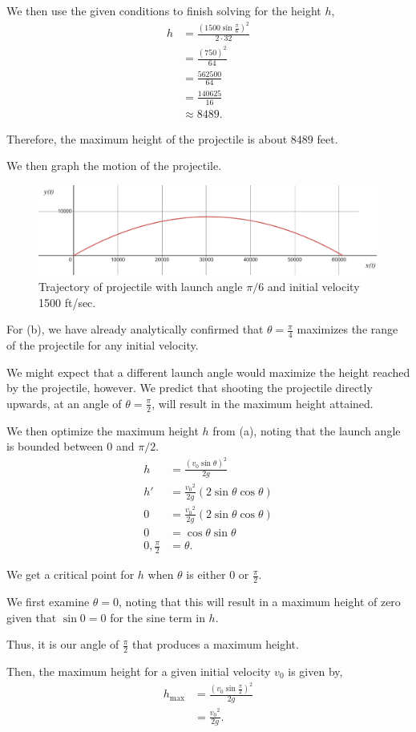 \documentclass[../hw10]{subfiles}
\begin{document}
We then use the given conditions to finish solving for the height $h$,
\begin{align*}
  h&=\frac{{(1500\sin{\frac{\pi}{6}})}^2}{2\cdot32} \\
  &= \frac{{(750)}^2}{64} \\
  &= \frac{562500}{64} \\
  &= \frac{140625}{16} \\
  &\approx 8489.
\end{align*}

Therefore, the maximum height of the projectile is about 8489 feet.

We then graph the motion of the projectile.
\begin{figure}[ht]
\centering
\includegraphics[width=0.8\linewidth]{../content/figure1.png}
\caption{Trajectory of projectile with launch angle $\pi/6$ and initial velocity 1500 ft/sec.}
\end{figure}

For (b), we have already analytically confirmed that $\theta=\frac{\pi}{4}$ maximizes the range of the projectile for any initial velocity. 

We might expect that a different launch angle would maximize the height reached by the projectile, however. We predict that shooting the projectile directly upwards, at an angle of $\theta=\frac{\pi}{2}$, will result in the maximum height attained.

We then optimize the maximum height $h$ from (a), noting that the launch angle is bounded between 0 and $\pi/2$.
\begin{align*}
    h&=\frac{{(v_0\sin{\theta})}^2}{2g} \\ 
    h'&=\frac{{v_0}^2}{2g}(2\sin{\theta}\cos{\theta}) \\
    0&=\frac{{v_0}^2}{2g}(2\sin{\theta}\cos{\theta}) \\
    0&=\cos{\theta}\sin{\theta} \\
    0,\frac{\pi}{2}&=\theta.
\end{align*}

We get a critical point for $h$ when $\theta$ is either $0$ or $\frac{\pi}{2}$. 

We first examine $\theta=0$, noting that this will result in a maximum height of zero given that $\sin{0}=0$ for the sine term in $h$. 

Thus, it is our angle of $\frac{\pi}{2}$ that produces a maximum height.

Then, the maximum height for a given initial velocity $v_0$ is given by,
\begin{align*}
    h_{\max}&=\frac{{(v_0\sin{\frac{\pi}{2}})}^2}{2g} \\
    &=\frac{{v_0}^2}{2g}.
\end{align*}
\end{document}
